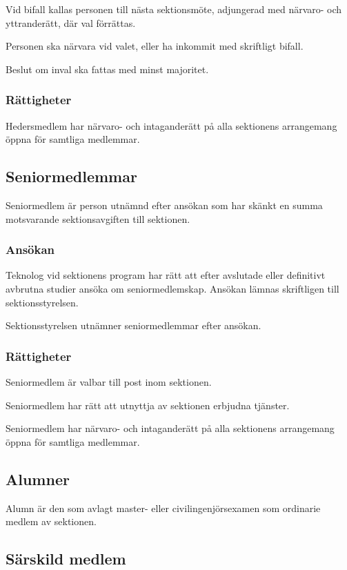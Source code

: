 \documentclass{styrdokument}
\begin{document}
\? Vid bifall kallas personen till nästa sektionsmöte, adjungerad med närvaro- och yttranderätt, där val förrättas.

\? Personen ska närvara vid valet, eller ha inkommit med skriftligt bifall.

\? Beslut om inval ska fattas med minst  majoritet.
\label{beslut.heders.inval}

\subsubsection{Rättigheter}
\? Hedersmedlem har närvaro- och intaganderätt på alla sektionens arrangemang öppna för samtliga medlemmar.

\subsection{Seniormedlemmar}

\? Seniormedlem är person utnämnd efter ansökan som har skänkt en summa motsvarande sektionsavgiften till sektionen.

\subsubsection{Ansökan}
\? Teknolog vid sektionens program har rätt att efter avslutade eller definitivt avbrutna studier ansöka om seniormedlemskap.
Ansökan lämnas skriftligen till sektionsstyrelsen.

\? Sektionsstyrelsen utnämner seniormedlemmar efter ansökan.

\subsubsection{Rättigheter}
\? Seniormedlem är valbar till post inom sektionen.

\? Seniormedlem har rätt att utnyttja av sektionen erbjudna tjänster.

\? Seniormedlem har närvaro- och intaganderätt på alla sektionens arrangemang öppna för samtliga medlemmar.

\subsection{Alumner}

\? Alumn är den som avlagt master- eller civilingenjörsexamen som ordinarie medlem av sektionen.

\subsection{Särskild medlem}
\end{document}
